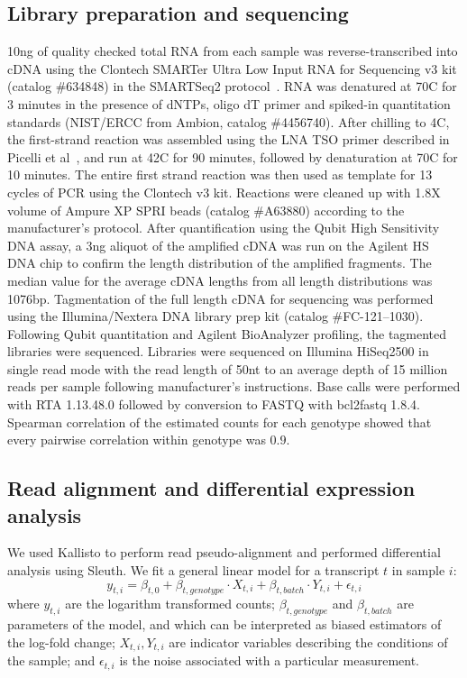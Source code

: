 \documentclass[9pt,twocolumn,twoside,lineno]{pnas-new}
\begin{document}
{\subsection*{Library preparation and sequencing}
10ng of quality checked total RNA from each sample was reverse-transcribed into
cDNA using the Clontech SMARTer Ultra Low Input RNA for Sequencing v3 kit
(catalog \#634848) in the SMARTSeq2 protocol~\cite{Picelli2014}.  RNA was
denatured at 70\degree{}C for 3 minutes in the presence of dNTPs, oligo dT
primer and spiked-in quantitation standards (NIST/ERCC from Ambion, catalog
\#4456740).  After chilling to 4\degree{}C, the first-strand reaction was
assembled using the LNA TSO primer described in Picelli et al~\cite{Picelli2014},
and run at 42\degree{}C for 90 minutes, followed by denaturation at 70\degree{}C
for 10 minutes.  The entire first strand reaction was then used as template for
13 cycles of PCR using the Clontech v3 kit. Reactions were cleaned up with 1.8X
volume of Ampure XP SPRI beads (catalog \#A63880) according to the manufacturer’s
protocol.  After quantification using the Qubit High Sensitivity DNA assay, a
3ng aliquot of the amplified cDNA was run on the Agilent HS DNA chip to confirm
the length distribution of the amplified fragments.  The median value for the
average cDNA lengths from all length distributions was 1076bp.  Tagmentation of
the full length cDNA for sequencing was performed using the Illumina/Nextera DNA
library prep kit (catalog \#FC-121--1030). Following Qubit quantitation and
Agilent BioAnalyzer profiling, the tagmented libraries were sequenced. Libraries
were sequenced on Illumina HiSeq2500 in single read mode with the read length of
50nt to an average depth of 15 million reads per sample following manufacturer's
instructions. Base calls were performed with RTA 1.13.48.0 followed by conversion
to FASTQ with bcl2fastq 1.8.4. Spearman correlation of the estimated counts for
each genotype showed that every pairwise correlation within genotype was $0.9$.

\subsection*{Read alignment and differential expression analysis}
We used Kallisto to perform read pseudo-alignment and performed differential
analysis using Sleuth. We fit a general linear model for a transcript $t$ in
sample $i$:
\begin{equation}
  y_{t,i} = \beta_{t, 0} + \beta_{t, genotype}\cdot{}X_{t, i} +
  \beta_{t, batch}\cdot{}Y_{t, i} + \epsilon_{t, i}
\end{equation}
where $y_{t, i}$ are the logarithm transformed counts; $\beta_{t, genotype}$ and
$\beta_{t, batch}$ are parameters of the model, and which can be interpreted as
biased estimators of the log-fold change; $X_{t, i}, Y_{t, i}$ are indicator
variables describing the conditions of the sample; and $\epsilon_{t, i}$ is the
noise associated with a particular measurement.

}
\end{document}
